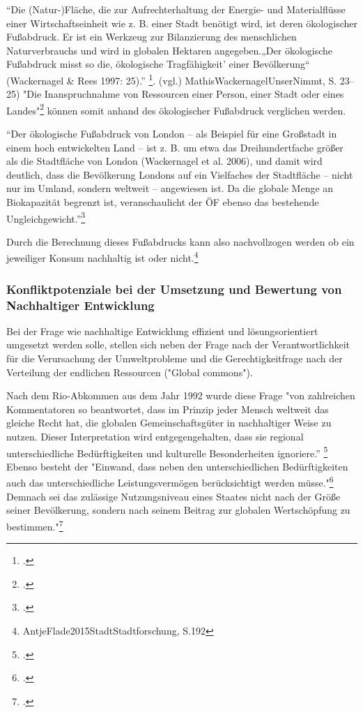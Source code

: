 \documentclass{scrartcl}
\begin{document}
“Die (Natur-)Fläche, die zur Aufrechterhaltung der Energie- und Materialflüsse einer Wirtschaftseinheit wie z. B. einer Stadt benötigt wird, ist deren ökologischer Fußabdruck. Er ist ein Werkzeug zur Bilanzierung des menschlichen Naturverbrauchs und wird in globalen Hektaren angegeben.„Der ökologische Fußabdruck misst so die‚ ökologische Tragfähigkeit’ einer Bevölkerung“ (Wackernagel & Rees 1997: 25).” \footcite{MichelsenGrundlagenEntwicklung, S.5}. 
(vgl.) MathisWackernagelUnserNimmt, S. 23–25)
"Die Inanspruchnahme von Ressourcen einer Person, einer Stadt oder eines Landes"\footcite{AntjeFlade2015StadtStadtforschung, S.192} können somit anhand des ökologischer Fußabdruck verglichen werden. 

\begin{displayquote}
“Der ökologische Fußabdruck von London – als Beispiel für eine Großstadt in einem hoch entwickelten Land – ist z. B. um etwa das Dreihundertfache größer als die Stadtfläche von London (Wackernagel et al. 2006), und damit wird deutlich, dass die Bevölkerung Londons auf ein Vielfaches der Stadtfläche – nicht nur im Umland, sondern weltweit – angewiesen ist. Da die globale Menge an Biokapazität begrenzt ist, veranschaulicht der ÖF ebenso das bestehende Ungleichgewicht.”\footcite{AntjeFlade2015StadtStadtforschung, S.192}
\end{displayquote} 

Durch die Berechnung dieses Fußabdrucks kann also nachvollzogen werden ob ein jeweiliger Konsum nachhaltig ist oder nicht.\footnote{AntjeFlade2015StadtStadtforschung, S.192 }



\subsubsection{Konfliktpotenziale bei der Umsetzung und Bewertung von Nachhaltiger Entwicklung}

Bei der Frage wie nachhaltige Entwicklung effizient und lösungsorientiert umgesetzt werden solle, stellen sich neben der Frage nach der Verantwortlichkeit für die Verursachung der Umweltprobleme und die Gerechtigkeitfrage nach der Verteilung der endlichen Ressourcen ("Global commons"). 

Nach dem Rio-Abkommen aus dem Jahr 1992 wurde diese Frage "von zahlreichen Kommentatoren so beantwortet, dass im Prinzip jeder Mensch weltweit das gleiche Recht hat, die globalen Gemeinschaftsgüter in nachhaltiger Weise zu nutzen. Dieser Interpretation wird entgegengehalten, dass sie regional unterschiedliche Bedürftigkeiten und kulturelle Besonderheiten ignoriere.” \footcite{NachhaltigeBrockhaus.de} Ebenso besteht der "Einwand, dass neben den unterschiedlichen Bedürftigkeiten auch das unterschiedliche Leistungsvermögen berücksichtigt werden müsse."\footcite{NachhaltigeBrockhaus.de} Demnach sei das zulässige Nutzungsniveau eines Staates nicht nach der Größe seiner Bevölkerung, sondern nach seinem Beitrag zur globalen Wertschöpfung zu bestimmen."\footcite{NachhaltigeBrockhaus.de}
\end{document}
